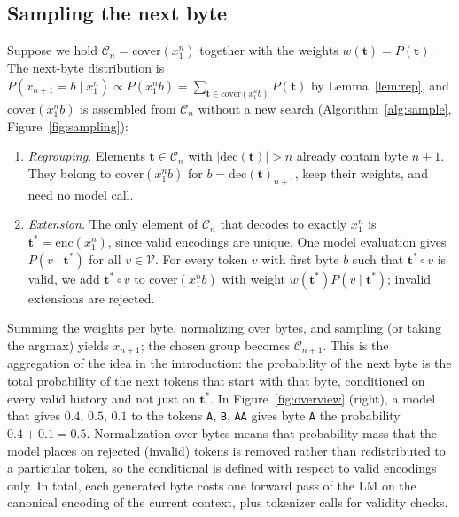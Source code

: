 \documentclass{article} %
\newcommand{\enc}{\mathrm{enc}}
\newcommand{\dec}{\mathrm{dec}}
\newcommand{\cover}{\mathrm{cover}}
\newcommand{\Vocab}{\mathcal{V}}
\newcommand{\tseq}{\mathbf{t}}
\newcommand{\bytelen}[1]{\lvert #1\rvert}
\begin{document}
\subsection{Sampling the next byte}
\label{sec:sampling}
Suppose we hold $\mathcal{C}_n=\cover(x_1^n)$ together with the weights $w(\tseq)=P(\tseq)$. The next-byte distribution is $P(x_{n+1}=b\mid x_1^n)\propto P(x_1^nb)=\sum_{\tseq\in\cover(x_1^nb)}P(\tseq)$ by Lemma~\ref{lem:rep}, and $\cover(x_1^nb)$ is assembled from $\mathcal{C}_n$ without a new search (Algorithm~\ref{alg:sample}, Figure~\ref{fig:sampling}):
\begin{enumerate}
\item \emph{Regrouping.} Elements $\tseq\in\mathcal{C}_n$ with $\bytelen{\dec(\tseq)}>n$ already contain byte $n+1$. They belong to $\cover(x_1^nb)$ for $b=\dec(\tseq)_{n+1}$, keep their weights, and need no model call.
\item \emph{Extension.} The only element of $\mathcal{C}_n$ that decodes to exactly $x_1^n$ is $\tseq^{*}=\enc(x_1^n)$, since valid encodings are unique. One model evaluation gives $P(v\mid\tseq^{*})$ for all $v\in\Vocab$. For every token $v$ with first byte $b$ such that $\tseq^*\circ v$ is valid, we add $\tseq^*\circ v$ to $\cover(x_1^nb)$ with weight $w(\tseq^{*})P(v\mid\tseq^{*})$; invalid extensions are rejected.
\end{enumerate}
Summing the weights per byte, normalizing over bytes, and sampling (or taking the argmax) yields $x_{n+1}$; the chosen group becomes $\mathcal{C}_{n+1}$. This is the aggregation of the idea in the introduction: the probability of the next byte is the total probability of the next tokens that start with that byte, conditioned on every valid history and not just on $\tseq^{*}$. In Figure~\ref{fig:overview} (right), a model that gives $0.4$, $0.5$, $0.1$ to the tokens \texttt{A}, \texttt{B}, \texttt{AA} gives byte \texttt{A} the probability $0.4+0.1=0.5$. Normalization over bytes means that probability mass that the model places on rejected (invalid) tokens is removed rather than redistributed to a particular token, so the conditional is defined with respect to valid encodings only. In total, each generated byte costs one forward pass of the LM on the canonical encoding of the current context, plus tokenizer calls for validity checks.
\end{document}
